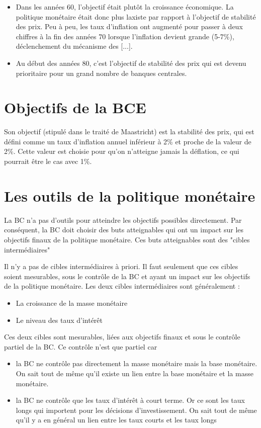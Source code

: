 \begin{itemize}
	\item Dans les années 60, l'objectif était plutôt la croissance économique. La politique monétaire était donc plus laxiste par rapport à l'objectif de stabilité des prix. Peu à peu, les taux d'inflation ont augmenté pour passer à deux chiffres à la fin des années 70 lorsque l'inflation devient grande (5-7\%), déclenchement du mécanisme des [...].
	\item Au début des années 80, c'est l'objectif de stabilité des prix qui est devenu prioritaire pour un grand nombre de banques centrales.
\end{itemize}

\section{Objectifs de la BCE}

Son objectif (stipulé dans le traité de Maastricht) est la stabilité des prix, qui est défini comme un taux d'inflation annuel inférieur à 2\% et proche de la valeur de 2\%. Cette valeur est choisie pour qu'on n'atteigne jamais la déflation, ce qui pourrait être le cas avec 1\%.

\section{Les outils de la politique monétaire}

La BC n'a pas d'outils pour atteindre les objectifs possibles directement. Par conséquent, la BC doit choisir des buts atteignables qui ont un impact sur les objectifs finaux de la politique monétaire. 
Ces buts atteignables sont des "cibles intermédiaires"

Il n'y a pas de cibles intermédiaires à priori. Il faut seulement que ces cibles soient mesurables, sous le contrôle de la BC et ayant un impact sur les objectifs de la politique monétaire. Les deux cibles intermédiaires sont généralement :

\begin{itemize}
	\item La croissance de la masse monétaire
	\item Le niveau des taux d'intérêt
\end{itemize}

Ces deux cibles sont mesurables, liées aux objectifs finaux et sous le contrôle partiel de la BC. Ce contrôle n'est que partiel car
\begin{itemize}
	\item la BC ne contrôle pas directement la masse monétaire mais la base monétaire. On sait tout de même qu'il existe un lien entre la base monétaire et la masse monétaire.
	\item la BC ne contrôle que les taux d'intérêt à court terme. Or ce sont les taux longs qui importent pour les décisions d'investissement. On sait tout de même qu'il y a en général un lien entre les taux courts et les taux longs
\end{itemize}

